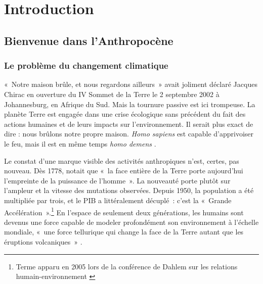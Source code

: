 \chapter{Introduction}

\section{Bienvenue dans l’Anthropocène}

\subsection{Le problème du changement climatique}
«~Notre maison brûle, et nous regardons ailleurs » avait joliment déclaré Jacques Chirac en ouverture du IV Sommet de la Terre le 2 septembre 2002 à Johannesburg, en Afrique du Sud. Mais la tournure passive est ici trompeuse. La planète Terre est engagée dans une crise écologique sans précédent du fait des actions humaines et de leurs impacts sur l'environnement. Il serait plus exact de dire : nous brûlons notre propre maison. \textit{Homo sapiens} est capable d’apprivoiser le feu, mais il est en même temps \textit{homo demens} \citep{Morin1999}.

Le constat d'une marque visible des activités anthropiques n'est, certes, pas nouveau. Dès 1778, \citeauthor{Buffon1778} notait que «~la face entière de la Terre porte aujourd'hui l'empreinte de la puissance de l'homme~». La nouveauté porte plutôt sur l'ampleur et la vitesse des mutations observées. Depuis 1950, la population a été multipliée par trois, et le PIB a littéralement décuplé : c’est la «~Grande Accélération~».\footnote{Terme apparu en 2005 lors de la conférence de Dahlem sur les relations humain-environnement \citep{costanza2006}}
En l'espace de seulement deux générations, les humains sont devenus une force capable de modeler profondément son environnement à l'échelle mondiale, «~une force tellurique qui change la face de la Terre autant que les éruptions volcaniques~» \citep{Fressoz2013}. 

